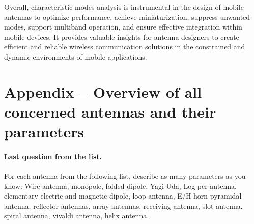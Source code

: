 \documentclass[11pt,a4paper]{article}
\begin{document}
Overall, characteristic modes analysis is instrumental in the design of mobile antennas to optimize performance, achieve miniaturization, suppress unwanted modes, support multiband operation, and ensure effective integration within mobile devices. It provides valuable insights for antenna designers to create efficient and reliable wireless communication solutions in the constrained and dynamic environments of mobile applications.

\newpage\section{\label{sec:appendix-antennas}Appendix -- Overview of all concerned antennas and their parameters}
\paragraph{Last question from the list.} For each antenna from the following list, describe as many parameters as you know: Wire antenna, monopole, folded  dipole, Yagi-Uda, Log per antenna, elementary electric and magnetic dipole, loop antenna, E/H horn pyramidal antenna, reflector antennas, array antennas, receiving antenna, slot antenna, spiral antenna, vivaldi antenna, helix antenna.
\end{document}
